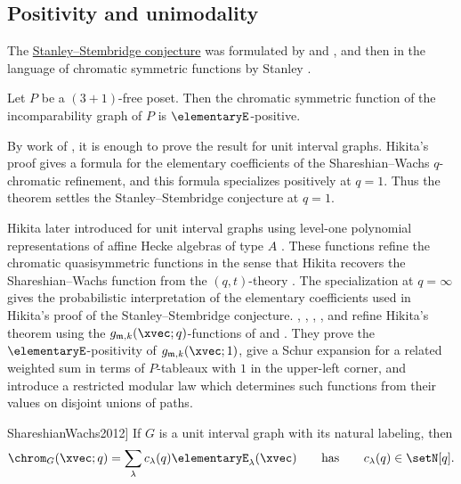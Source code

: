 \subsection[chromaticEExpansionConjectures]{Positivity and unimodality}

The \hyperref[stanleyStembridgeConjecture]{Stanley--Stembridge conjecture}
was formulated by  and 
\cite{StanleyStembridge1993}, and then in the language of chromatic symmetric
functions by Stanley \cite{Stanley1995}.

\begin{theorem}
Let $P$ be a $(3+1)$-free poset. Then the chromatic symmetric function of
the incomparability graph of $P$ is $\elementaryE$-positive.
\end{theorem}

By work of  \cite{GuayPaquet2013}, it is enough to
prove the result for unit interval graphs. Hikita's proof gives a formula for
the elementary coefficients of the Shareshian--Wachs
$q$-chromatic refinement, and this formula specializes positively at $q=1$.
Thus the theorem settles the Stanley--Stembridge conjecture at $q=1$.

Hikita later introduced 
\label{qtChromaticSymmetricFunction} for
unit interval graphs using level-one polynomial representations of affine
Hecke algebras of type $A$ \cite{Hikita2025x}.  These functions refine the
chromatic quasisymmetric functions in the sense that Hikita recovers the
Shareshian--Wachs function from the $(q,t)$-theory
\cite[Thm.~6.1]{Hikita2025x}.  The specialization at $q=\infty$ gives the
probabilistic interpretation of the elementary coefficients used in Hikita's
proof of the Stanley--Stembridge conjecture.
, , ,
, and  refine Hikita's theorem using
the $g_{\mathfrak{m},k}(\xvec;q)$-functions of
 and  \cite{HuhHwangKimKimOh2025x}.
They prove the $\elementaryE$-positivity of
$g_{\mathfrak{m},k}(\xvec;1)$, give a Schur expansion for a related
weighted sum in terms of $P$-tableaux with $1$ in the upper-left corner, and
introduce a restricted modular law which determines such functions from
their values on disjoint unions of paths.

\begin{conjecture}[Shareshian--Wachs, \cite[Conj.~4.9]{ShareshianWachs2012}]
\label{chromaticEShareshianWachsConjecture}
If $G$ is a unit interval graph with its natural labeling, then
\[
\chrom_G(\xvec;q) = \sum_{\lambda} c_\lambda(q)\elementaryE_\lambda(\xvec)
\qquad\text{has}\qquad c_\lambda(q) \in \setN[q].
\]
\end{conjecture}

